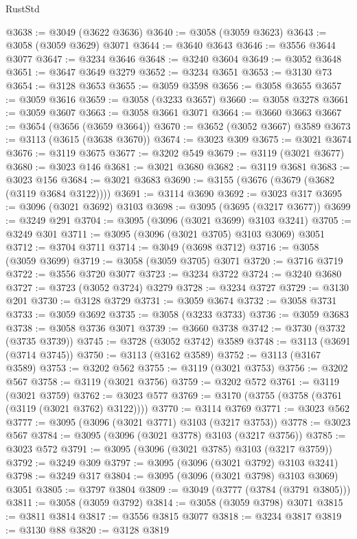 \begin{lexlean}{RustStd}
\begin{coremodule}
{\begin{coremodule}
{{{{{{{{{{{{{{{{{{{{{{{{{{{{{{{{@3638 := @3049 (@3622 @3636)
@3640 := @3058 (@3059 @3623)
@3643 := @3058 (@3059 @3629) @3071
@3644 := @3640 @3643
@3646 := @3556 @3644 @3077
@3647 := @3234 @3646
@3648 := @3240 @3604
@3649 := @3052 @3648
@3651 := @3647 @3649 @3279
@3652 := @3234 @3651
@3653 := @3130 @73
@3654 := @3128 @3653
@3655 := @3059 @3598
@3656 := @3058 @3655
@3657 := @3059 @3616
@3659 := @3058 (@3233 @3657)
@3660 := @3058 @3278
@3661 := @3059 @3607
@3663 := @3058 @3661 @3071
@3664 := @3660 @3663
@3667 := @3654 (@3656 (@3659 @3664))
@3670 := @3652 (@3052 @3667) @3589
@3673 := @3113 (@3615 (@3638 @3670))
@3674 := @3023 @309
@3675 := @3021 @3674
@3676 := @3119 @3675
@3677 := @3202 @549
@3679 := @3119 (@3021 @3677)
@3680 := @3023 @146
@3681 := @3021 @3680
@3682 := @3119 @3681
@3683 := @3023 @156
@3684 := @3021 @3683
@3690 := @3155 (@3676 (@3679 (@3682 (@3119 @3684 @3122))))
@3691 := @3114 @3690
@3692 := @3023 @317
@3695 := @3096 (@3021 @3692) @3103
@3698 := @3095 (@3695 (@3217 @3677))
@3699 := @3249 @291
@3704 := @3095 (@3096 (@3021 @3699) @3103 @3241)
@3705 := @3249 @301
@3711 := @3095 (@3096 (@3021 @3705) @3103 @3069) @3051
@3712 := @3704 @3711
@3714 := @3049 (@3698 @3712)
@3716 := @3058 (@3059 @3699)
@3719 := @3058 (@3059 @3705) @3071
@3720 := @3716 @3719
@3722 := @3556 @3720 @3077
@3723 := @3234 @3722
@3724 := @3240 @3680
@3727 := @3723 (@3052 @3724) @3279
@3728 := @3234 @3727
@3729 := @3130 @201
@3730 := @3128 @3729
@3731 := @3059 @3674
@3732 := @3058 @3731
@3733 := @3059 @3692
@3735 := @3058 (@3233 @3733)
@3736 := @3059 @3683
@3738 := @3058 @3736 @3071
@3739 := @3660 @3738
@3742 := @3730 (@3732 (@3735 @3739))
@3745 := @3728 (@3052 @3742) @3589
@3748 := @3113 (@3691 (@3714 @3745))
@3750 := @3113 (@3162 @3589)
@3752 := @3113 (@3167 @3589)
@3753 := @3202 @562
@3755 := @3119 (@3021 @3753)
@3756 := @3202 @567
@3758 := @3119 (@3021 @3756)
@3759 := @3202 @572
@3761 := @3119 (@3021 @3759)
@3762 := @3023 @577
@3769 := @3170 (@3755 (@3758 (@3761 (@3119 (@3021 @3762) @3122))))
@3770 := @3114 @3769
@3771 := @3023 @562
@3777 := @3095 (@3096 (@3021 @3771) @3103 (@3217 @3753))
@3778 := @3023 @567
@3784 := @3095 (@3096 (@3021 @3778) @3103 (@3217 @3756))
@3785 := @3023 @572
@3791 := @3095 (@3096 (@3021 @3785) @3103 (@3217 @3759))
@3792 := @3249 @309
@3797 := @3095 (@3096 (@3021 @3792) @3103 @3241)
@3798 := @3249 @317
@3804 := @3095 (@3096 (@3021 @3798) @3103 @3069) @3051
@3805 := @3797 @3804
@3809 := @3049 (@3777 (@3784 (@3791 @3805)))
@3811 := @3058 (@3059 @3792)
@3814 := @3058 (@3059 @3798) @3071
@3815 := @3811 @3814
@3817 := @3556 @3815 @3077
@3818 := @3234 @3817
@3819 := @3130 @88
@3820 := @3128 @3819
}}}}}}}}}}}}}}}}}}}}}}}}}}}}}}}}
\end{coremodule}}
\end{coremodule}
\end{lexlean}

